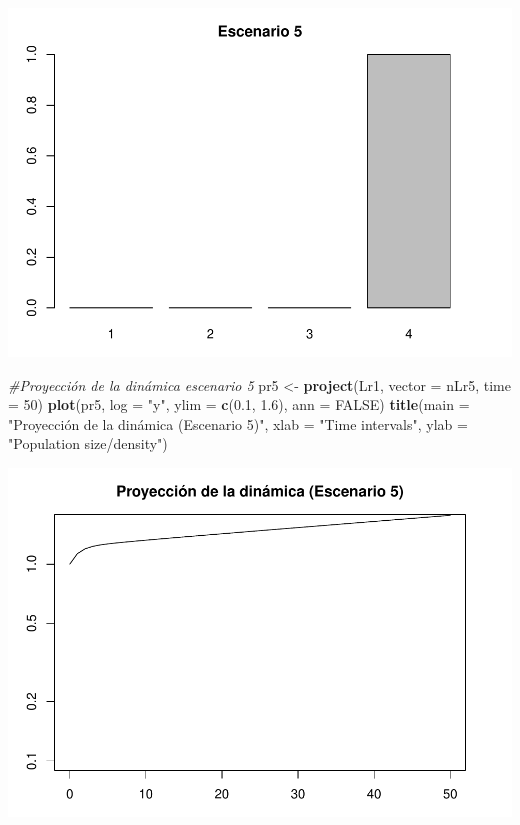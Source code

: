 \documentclass[
]{book}
\newenvironment{Shaded}{\begin{snugshade}}{\end{snugshade}}
\newcommand{\AttributeTok}[1]{\textcolor[rgb]{0.13,0.29,0.53}{#1}}
\newcommand{\CommentTok}[1]{\textcolor[rgb]{0.56,0.35,0.01}{\textit{#1}}}
\newcommand{\ConstantTok}[1]{\textcolor[rgb]{0.56,0.35,0.01}{#1}}
\newcommand{\DecValTok}[1]{\textcolor[rgb]{0.00,0.00,0.81}{#1}}
\newcommand{\FloatTok}[1]{\textcolor[rgb]{0.00,0.00,0.81}{#1}}
\newcommand{\FunctionTok}[1]{\textcolor[rgb]{0.13,0.29,0.53}{\textbf{#1}}}
\newcommand{\NormalTok}[1]{#1}
\newcommand{\OtherTok}[1]{\textcolor[rgb]{0.56,0.35,0.01}{#1}}
\newcommand{\StringTok}[1]{\textcolor[rgb]{0.31,0.60,0.02}{#1}}
\theoremstyle{definition}
\theoremstyle{definition}
\theoremstyle{definition}
\theoremstyle{definition}
\theoremstyle{remark}
\begin{document}
\includegraphics{Diagnostico_Poblacional_files/figure-latex/chap10_4-9.pdf}

\begin{Shaded}
\begin{Highlighting}[]
\CommentTok{\#Proyección de la dinámica escenario 5 }
\NormalTok{pr5 }\OtherTok{\textless{}{-}} \FunctionTok{project}\NormalTok{(Lr1, }\AttributeTok{vector =}\NormalTok{ nLr5, }\AttributeTok{time =} \DecValTok{50}\NormalTok{)}
\FunctionTok{plot}\NormalTok{(pr5, }\AttributeTok{log =} \StringTok{"y"}\NormalTok{, }\AttributeTok{ylim =} \FunctionTok{c}\NormalTok{(}\FloatTok{0.1}\NormalTok{, }\FloatTok{1.6}\NormalTok{), }\AttributeTok{ann =} \ConstantTok{FALSE}\NormalTok{)}
\FunctionTok{title}\NormalTok{(}\AttributeTok{main =} \StringTok{"Proyección de la dinámica (Escenario 5)"}\NormalTok{, }\AttributeTok{xlab =} \StringTok{"Time intervals"}\NormalTok{, }\AttributeTok{ylab =} \StringTok{"Population size/density"}\NormalTok{)}
\end{Highlighting}
\end{Shaded}

\includegraphics{Diagnostico_Poblacional_files/figure-latex/chap10_4-10.pdf}
\end{document}
